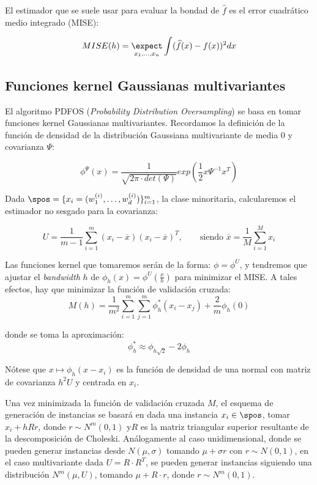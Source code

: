 El estimador que se suele usar para evaluar la bondad de $\widehat{f}$ es el error cuadrático medio integrado (MISE):

\[MISE(h) = \underset{x_1, \ldots, x_n}{\expect} \int (\widehat{f}(x) - f(x))^2 dx\]

\subsection{Funciones kernel Gaussianas multivariantes}
El algoritmo PDFOS (\textit{Probability Distribution Oversampling}) se basa en tomar funciones kernel Gaussianas multivariantes.
Recordamos la definición de la función de densidad de la distribución Gaussiana multivariante de media $0$ y covarianza $\Psi$:

\[\phi^{\Psi}(x) = \frac{1}{\sqrt{2\pi \cdot det(\Psi)}} exp\left(\frac{1}{2} x \Psi^{-1} x^T \right)\]

Dada $\spos = \{x_i = (w_1^{(i)}, \ldots, w_d^{(i)})\}_{i=1}^m$, la clase minoritaria, calcularemos el estimador no sesgado 
para la covarianza:

\[U = \frac{1}{m-1} \sum_{i=1}^m (x_i - \overline{x})(x_i - \overline{x})^T, 
  \qquad \textrm{siendo } \overline{x} = \frac{1}{M}\sum_{i=1}^M x_i\]
  
Las funciones kernel que tomaremos serán de la forma: $\phi = \phi^{U}$, y tendremos que ajustar el \textit{bandwidth} $h$ de
$\phi_h(x) = \phi^U\left(\frac{x}{h}\right)$ para minimizar el MISE. A tales efectos, hay que minimizar la función de validación
cruzada:
\[M(h) = \frac{1}{m^2} \sum_{i=1}^m \sum_{j=1}^m \phi_h^{\ast} (x_i - x_j) + \frac{2}{m} \phi_h(0)\]

donde se toma la aproximación:
\[\phi_h^{\ast} \approx \phi_{h\sqrt{2}} - 2\phi_h\]

Nótese que $x\mapsto \phi_h(x-x_i)$ es la función de densidad de una normal con matriz de covarianza $h^2 U$ y centrada en $x_i$.

Una vez minimizada la función de validación cruzada $M$, el esquema de generación de instancias se basará en dada una instancia
$x_i \in \spos$, tomar $x_i + h R r$, donde $r\sim N^m(0,1)$ y$R$ es la matriz triangular superior resultante de la descomposición
de Choleski. Análogamente al caso unidimensional, donde se pueden generar instancias desde $N(\mu, \sigma)$ tomando $\mu + \sigma r$
con $r\sim N(0,1)$, en el caso multivariante dada $U =  R \cdot R^T$, se pueden generar instancias siguiendo una distribución $N^m(\mu, U)$,
tomando $\mu + R \cdot r$, donde $r\sim N^m(0,1)$.

